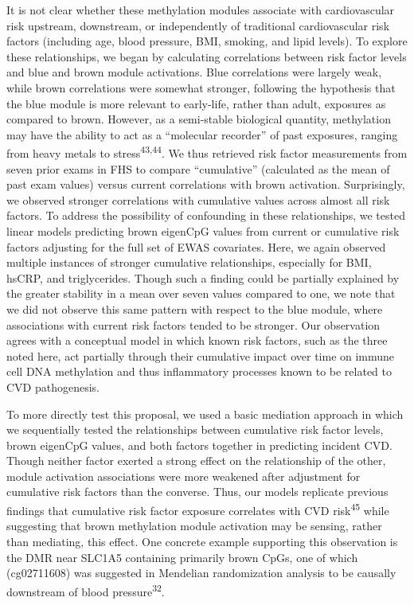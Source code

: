 \documentclass[]{article}
\theoremstyle{definition}
\theoremstyle{definition}
\theoremstyle{definition}
\theoremstyle{remark}
\begin{document}
It is not clear whether these methylation modules associate with
cardiovascular risk upstream, downstream, or independently of
traditional cardiovascular risk factors (including age, blood pressure,
BMI, smoking, and lipid levels). To explore these relationships, we
began by calculating correlations between risk factor levels and blue
and brown module activations. Blue correlations were largely weak,
while brown correlations were somewhat stronger, following the
hypothesis that the blue module is more relevant to early-life, rather
than adult, exposures as compared to brown. However, as a semi-stable
biological quantity, methylation may have the ability to act as a
``molecular recorder'' of past exposures, ranging from heavy metals to
stress\textsuperscript{43,44}. We thus retrieved risk factor
measurements from seven prior exams in FHS to compare ``cumulative''
(calculated as the mean of past exam values) versus current correlations
with brown activation. Surprisingly, we observed stronger correlations
with cumulative values across almost all risk factors. To address the
possibility of confounding in these relationships, we tested linear
models predicting brown eigenCpG values from current or cumulative risk
factors adjusting for the full set of EWAS covariates. Here, we again
observed multiple instances of stronger cumulative relationships,
especially for BMI, hsCRP, and triglycerides. Though such a finding
could be partially explained by the greater stability in a mean over
seven values compared to one, we note that we did not observe this same
pattern with respect to the blue module, where associations with current
risk factors tended to be stronger. Our observation agrees with a
conceptual model in which known risk factors, such as the three noted
here, act partially through their cumulative impact over time on immune
cell DNA methylation and thus inflammatory processes known to be related
to CVD pathogenesis.

To more directly test this proposal, we used a basic mediation approach
in which we sequentially tested the relationships between cumulative
risk factor levels, brown eigenCpG values, and both factors together in
predicting incident CVD. Though neither factor exerted a strong effect
on the relationship of the other, module activation associations were
more weakened after adjustment for cumulative risk factors than the
converse. Thus, our models replicate previous findings that cumulative
risk factor exposure correlates with CVD risk\textsuperscript{45} while
suggesting that brown methylation module activation may be sensing,
rather than mediating, this effect. One concrete example supporting this
observation is the DMR near SLC1A5 containing primarily brown CpGs, one
of which (cg02711608) was suggested in Mendelian randomization analysis
to be causally downstream of blood pressure\textsuperscript{32}.
\end{document}
